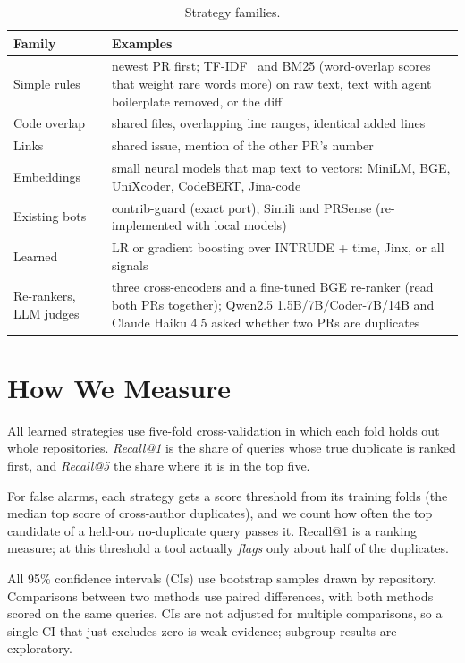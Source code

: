 \documentclass[10pt,conference]{IEEEtran}
\begin{document}
\begin{table}[t]\centering\caption{Strategy families.}\label{tab:families}
\small\begin{tabular}{@{}p{}p{}@{}}\toprule
Family & Examples\\\midrule
Simple rules & newest PR first; TF-IDF~\cite{li2017detecting} and BM25 (word-overlap scores that weight rare words more) on raw text, text with agent boilerplate removed, or the diff\\
Code overlap & shared files, overlapping line ranges, identical added lines\\
Links & shared issue, mention of the other PR's number\\
Embeddings & small neural models that map text to vectors: MiniLM, BGE, UniXcoder, CodeBERT, Jina-code\\
Existing bots & contrib-guard (exact port), Simili and PRSense (re-implemented with local models)\\
Learned & LR or gradient boosting over INTRUDE + time, Jinx, or all signals\\
Re-rankers, LLM judges & three cross-encoders and a fine-tuned BGE re-ranker (read both PRs together); Qwen2.5 1.5B/7B/Coder-7B/14B and Claude Haiku 4.5 asked whether two PRs are duplicates\\\bottomrule
\end{tabular}\end{table}

\section{How We Measure}
All learned strategies use five-fold cross-validation in which each fold holds out whole repositories. \emph{Recall@1} is the share of queries whose true duplicate is ranked first, and \emph{Recall@5} the share where it is in the top five.

For false alarms, each strategy gets a score threshold from its training folds (the median top score of cross-author duplicates), and we count how often the top candidate of a held-out no-duplicate query passes it. Recall@1 is a ranking measure; at this threshold a tool actually \emph{flags} only about half of the duplicates.

All 95\% confidence intervals (CIs) use \nBoot{} bootstrap samples drawn by repository. Comparisons between two methods use paired differences, with both methods scored on the same queries. CIs are not adjusted for multiple comparisons, so a single CI that just excludes zero is weak evidence; subgroup results are exploratory.
\end{document}
